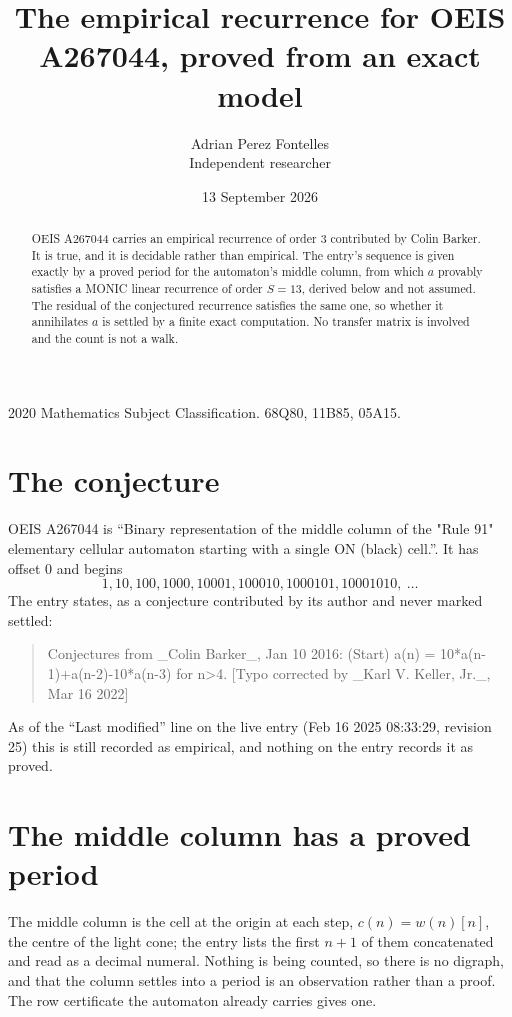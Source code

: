 \documentclass[11pt,a4paper]{article}
\title{The empirical recurrence for OEIS A267044, proved from an exact model}
\author{Adrian Perez Fontelles\\ \small Independent researcher}
\date{13 September 2026}
\theoremstyle{plain}
\theoremstyle{definition}
\begin{document}
\maketitle

\begin{abstract}
OEIS A267044 carries an empirical recurrence of order $3$ contributed by Colin Barker. It is true, and it is
decidable rather than empirical. The entry's sequence is given exactly by a proved period for the automaton's middle column, from
which $a$ provably satisfies a MONIC linear recurrence of order $S=13$, derived below and not
assumed. The residual of the conjectured recurrence satisfies the same one, so whether it
annihilates $a$ is settled by a finite exact computation. No transfer matrix is involved and
the count is not a walk.
\end{abstract}

\noindent\small 2020 Mathematics Subject Classification. 68Q80, 11B85, 05A15.\normalsize

\section{The conjecture}

OEIS A267044 is ``Binary representation of the middle column of the "Rule 91" elementary cellular automaton starting with a single ON (black) cell.''. It has offset $0$ and begins
\[
1, 10, 100, 1000, 10001, 100010, 1000101, 10001010,\ \dots
\]
The entry states, as a conjecture contributed by its author and never marked settled:
\begin{quote}
Conjectures from \_Colin Barker\_, Jan 10 2016: (Start) a(n) = 10*a(n-1)+a(n-2)-10*a(n-3) for n>4. [Typo corrected by \_Karl V. Keller, Jr.\_, Mar 16 2022]
\end{quote}
As of the ``Last modified'' line on the live entry (Feb 16 2025 08:33:29, revision 25)
this is still recorded as empirical, and nothing on the entry records it as proved.

\section{The middle column has a proved period}

The middle column is the cell at the origin at each step, $c(n)=w(n)[n]$, the centre of the
light cone; the entry lists the first $n+1$ of them concatenated and read as a decimal numeral. Nothing is being counted, so there is no digraph, and that
the column settles into a period is an observation rather than a proof. The row certificate the
automaton already carries gives one.
\end{document}

